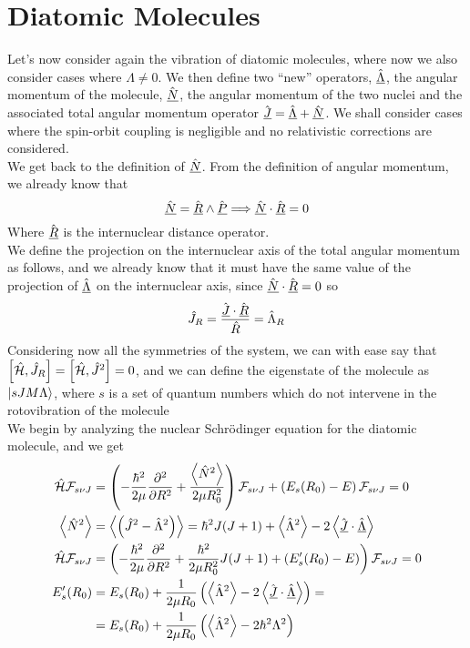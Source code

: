 \documentclass[../qm.tex]{subfiles}
\begin{document}
	\section{Diatomic Molecules}
	Let's now consider again the vibration of diatomic molecules, where now we also consider cases where $\Lambda\ne0$. We then define two ``new'' operators, $\hat{\underline{\Lambda}}$, the angular momentum of the molecule, $\hat{\underline{N}}$, the angular momentum of the two nuclei and the associated total angular momentum operator $\hat{\underline{J}}=\hat{\underline{\Lambda}}+\hat{\underline{N}}$. We shall consider cases where the spin-orbit coupling is negligible and no relativistic corrections are considered.\\
	We get back to the definition of $\hat{\underline{N}}$. From the definition of angular momentum, we already know that
	\begin{equation*}
		\hat{\underline{N}}=\hat{\underline{R}}\wedge\hat{\underline{P}}\Longrightarrow\hat{\underline{N}}\cdot\hat{\underline{R}}=0
	\end{equation*}
	Where $\hat{\underline{R}}$ is the internuclear distance operator.\\
	We define the projection on the internuclear axis of the total angular momentum as follows, and we already know that it must have the same value of the projection of $\hat{\underline{\Lambda}}$ on the internuclear axis, since $\hat{\underline{N}}\cdot\hat{\underline{R}}=0$ so
	\begin{equation*}
		\hat{J}_R=\frac{\hat{\underline{J}}\cdot\hat{\underline{R}}}{\hat{R}}=\hat{\Lambda}_R
	\end{equation*}
	Considering now all the symmetries of the system, we can with ease say that $\comm{\opr{\ham}}{\opr{J}_R}=\comm{\opr{\ham}}{\opr{J}^2}=0$, and we can define the eigenstate of the molecule as $\ket{sJM\Lambda}$, where $s$ is a set of quantum numbers which do not intervene in the rotovibration of the molecule\\
	We begin by analyzing the nuclear Schrödinger equation for the diatomic molecule, and we get
	\begin{equation}
		\begin{aligned}
			\hat{\mathcal{H}}\mathcal{F}_{s\nu J}&=\left( -\frac{\hbar^2}{2\mu}\pdv[2]{R}+\frac{\expval{\hat{N}^2}}{2\mu R_0^2} \right)\mathcal{F}_{s\nu J}+\left( E_s(R_0)-E \right)\mathcal{F}_{s\nu J}=0\\
			\expval{\hat{N}^2}&=\expval{\left( \hat{J}^2-\hat{\Lambda}^2 \right)}=\hbar^2J(J+1)+\expval{\hat{\Lambda}^2}-2\expval{\hat{\underline{J}}\cdot\hat{\underline{\Lambda}}}\\
			\hat{\mathcal{H}}\mathcal{F}_{s\nu J}&=\left( -\frac{\hbar^2}{2\mu}\pdv[2]{R}+\frac{\hbar^2}{2\mu R_0^2}J(J+1)+(E_s'(R_0)-E) \right)\mathcal{F}_{s\nu J}=0\\
			E_s'(R_0)&=E_s(R_0)+\frac{1}{2\mu R_0}\left( \expval{\hat{\Lambda}^2}-2\expval{\hat{\underline{J}}\cdot\hat{\underline{\Lambda}}} \right)=\\
			&=E_s(R_0)+\frac{1}{2\mu R_0}\left( \expval{\hat{\Lambda}^2}-2\hbar^2\Lambda^2 \right)
		\end{aligned}
		\label{eq:nuclearschrodingerlambdane0}
	\end{equation}
\end{document}
